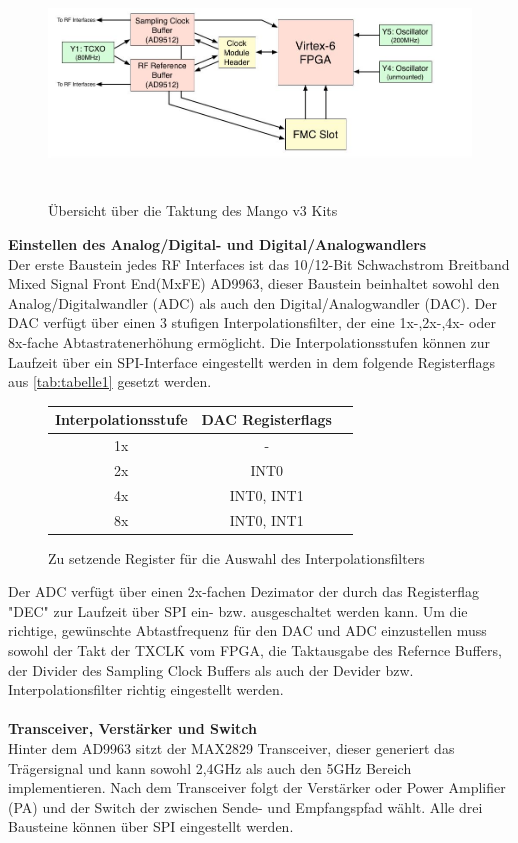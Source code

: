 \documentclass[letterpaper,11pt]{article}
\begin{document}
\begin{onehalfspace}
\begin{figure}[H]
\begin{center}
\includegraphics[width = 16cm,height=6cm]{Unbenannt.jpg}
\caption{Übersicht über die Taktung des Mango v3 Kits \cite{[4]}}
\label{fig4}
\end{center}
\end{figure}
\noindent\textbf{Einstellen des Analog/Digital- und Digital/Analogwandlers}\\
Der erste Baustein jedes RF Interfaces ist das 
10/12-Bit Schwachstrom Breitband Mixed Signal Front End(MxFE) AD9963, dieser Baustein beinhaltet sowohl den Analog/Digitalwandler (ADC) als auch den Digital/Analogwandler (DAC). Der DAC verfügt über einen 3 stufigen Interpolationsfilter, der eine 1x-,2x-,4x- oder 8x-fache Abtastratenerhöhung ermöglicht. Die Interpolationsstufen können zur Laufzeit über ein SPI-Interface eingestellt werden in dem folgende Registerflags aus \autoref{tab:tabelle1} gesetzt werden. 
\begin{figure}[H]
\begin{center}
\begin{tabular}{|c|c|p{7cm}}\hline
\small
  \textbf{Interpolationsstufe} & \textbf{DAC Registerflags} \\ \hline
  1x & - \\\hline
  2x & INT0\\\hline
  4x & INT0, INT1 \\\hline
  8x & INT0, INT1 \\\hline
 \end{tabular}
 \caption{Zu setzende Register für die Auswahl des Interpolationsfilters}
  \label{tab:tabelle1}
  \end{center}
 \end{figure}
\noindent Der ADC verfügt über einen 2x-fachen Dezimator der durch das Registerflag "DEC" zur Laufzeit über SPI ein- bzw. ausgeschaltet werden kann. 
Um die richtige, gewünschte Abtastfrequenz für den DAC und ADC einzustellen muss sowohl der Takt der TXCLK vom FPGA, die Taktausgabe des Refernce Buffers, der Divider des Sampling Clock Buffers als auch der Devider bzw. Interpolationsfilter richtig eingestellt werden.\\
\\
\noindent\textbf{Transceiver, Verstärker und Switch  }\\
Hinter dem AD9963 sitzt der MAX2829 Transceiver, dieser generiert das Trägersignal und kann sowohl 2,4GHz als auch den 5GHz Bereich implementieren. Nach dem Transceiver folgt der Verstärker oder Power Amplifier (PA) und der Switch der zwischen Sende- und Empfangspfad wählt. Alle drei Bausteine können über SPI eingestellt werden.


\end{onehalfspace}
\end{document}
